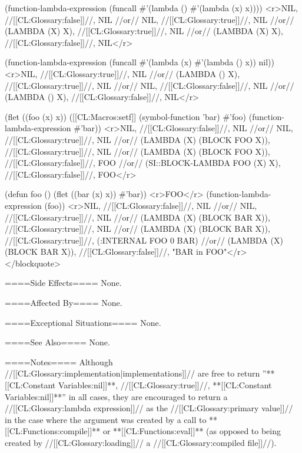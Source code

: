 (function-lambda-expression (funcall #'(lambda () #'(lambda (x) x)))) 
<r>NIL, //[[CL:Glossary:false]]//, NIL 
//or// NIL, //[[CL:Glossary:true]]//, NIL 
//or// (LAMBDA (X) X), //[[CL:Glossary:true]]//, NIL 
//or// (LAMBDA (X) X), //[[CL:Glossary:false]]//, NIL</r>

(function-lambda-expression (funcall #'(lambda (x) #'(lambda () x)) nil)) 
<r>NIL, //[[CL:Glossary:true]]//, NIL 
//or// (LAMBDA () X), //[[CL:Glossary:true]]//, NIL 
//or// NIL, //[[CL:Glossary:false]]//, NIL 
//or// (LAMBDA () X), //[[CL:Glossary:false]]//, NIL</r>

(flet ((foo (x) x)) 
  ([[CL:Macros:setf]] (symbol-function 'bar) #'foo) 
  (function-lambda-expression #'bar))
<r>NIL, //[[CL:Glossary:false]]//, NIL 
//or// NIL, //[[CL:Glossary:true]]//, NIL 
//or// (LAMBDA (X) (BLOCK FOO X)), //[[CL:Glossary:true]]//, NIL 
//or// (LAMBDA (X) (BLOCK FOO X)), //[[CL:Glossary:false]]//, FOO
//or// (SI::BLOCK-LAMBDA FOO (X) X), //[[CL:Glossary:false]]//, FOO</r>

(defun foo () 
  (flet ((bar (x) x)) #'bar)) <r>FOO</r>
(function-lambda-expression (foo)) 
<r>NIL, //[[CL:Glossary:false]]//, NIL 
//or// NIL, //[[CL:Glossary:true]]//, NIL 
//or// (LAMBDA (X) (BLOCK BAR X)), //[[CL:Glossary:true]]//, NIL 
//or// (LAMBDA (X) (BLOCK BAR X)), //[[CL:Glossary:true]]//, (:INTERNAL FOO 0 BAR) 
//or// (LAMBDA (X) (BLOCK BAR X)), //[[CL:Glossary:false]]//, "BAR in FOO"</r>
</blockquote>

====Side Effects====
None.

====Affected By====
None.

====Exceptional Situations====
None.

====See Also====
None.

====Notes====
Although //[[CL:Glossary:implementation|implementations]]// are free to return ''**[[CL:Constant Variables:nil]]**, //[[CL:Glossary:true]]//, **[[CL:Constant Variables:nil]]**'' in all cases, they are encouraged to return a //[[CL:Glossary:lambda expression]]// as the //[[CL:Glossary:primary value]]// in the case where the argument was created by a call to **[[CL:Functions:compile]]** or **[[CL:Functions:eval]]** (as opposed to being created by //[[CL:Glossary:loading]]// a //[[CL:Glossary:compiled file]]//).

